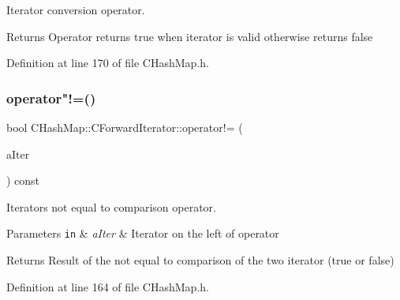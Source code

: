 Iterator conversion operator. 

\begin{DoxyReturn}{Returns}
Operator returns {\ttfamily true} when iterator is valid otherwise returns {\ttfamily false} 
\end{DoxyReturn}


Definition at line 170 of file C\+Hash\+Map.\+h.

\mbox{\label{class_c_hash_map_1_1_c_forward_iterator_a44785d54dad6b20115e28cd9df5ac0b9}} 
\subsubsection{\texorpdfstring{operator"!=()}{operator!=()}}
{\footnotesize\ttfamily bool C\+Hash\+Map\+::\+C\+Forward\+Iterator\+::operator!= (\begin{DoxyParamCaption}\item[{const \hyperlink{class_c_hash_map_1_1_c_forward_iterator}{C\+Forward\+Iterator} \&}]{a\+Iter }\end{DoxyParamCaption}) const\hspace{0.3cm}{\ttfamily [inline]}}



Iterators not equal to comparison operator. 


\begin{DoxyParams}[1]{Parameters}
\mbox{\tt in}  & {\em a\+Iter} & Iterator on the left of operator \\
\hline
\end{DoxyParams}
\begin{DoxyReturn}{Returns}
Result of the not equal to comparison of the two iterator ({\ttfamily true} or {\ttfamily false}) 
\end{DoxyReturn}


Definition at line 164 of file C\+Hash\+Map.\+h.

\mbox{\label{class_c_hash_map_1_1_c_forward_iterator_a7f44403bd74fc55f0263b56cf15fc64b}} 
